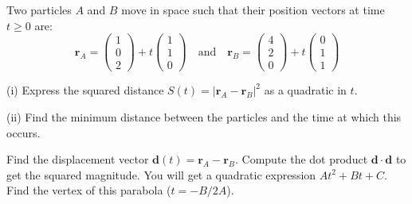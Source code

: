 \begin{problem}
Two particles $A$ and $B$ move in space such that their position vectors at time $t \ge 0$ are:
\[ \mathbf{r}_A = \begin{pmatrix} 1 \\ 0 \\ 2 \end{pmatrix} + t \begin{pmatrix} 1 \\ 1 \\ 0 \end{pmatrix} \quad \text{and} \quad \mathbf{r}_B = \begin{pmatrix} 4 \\ 2 \\ 0 \end{pmatrix} + t \begin{pmatrix} 0 \\ 1 \\ 1 \end{pmatrix} \]

(i) Express the squared distance $S(t) = |\mathbf{r}_A - \mathbf{r}_B|^2$ as a quadratic in $t$.

(ii) Find the minimum distance between the particles and the time at which this occurs.
\end{problem}

\begin{hint}
Find the displacement vector $\mathbf{d}(t) = \mathbf{r}_A - \mathbf{r}_B$.
Compute the dot product $\mathbf{d} \cdot \mathbf{d}$ to get the squared magnitude.
You will get a quadratic expression $At^2 + Bt + C$. Find the vertex of this parabola ($t = -B/2A$).
\end{hint}

